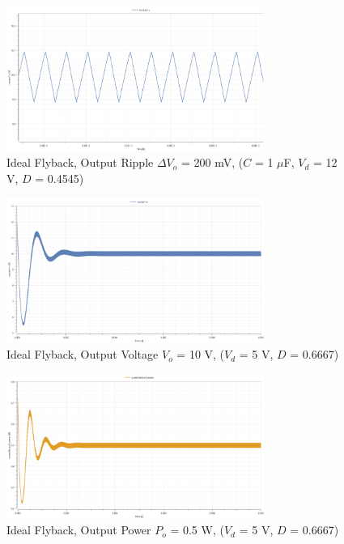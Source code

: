 \documentclass[12pt,twoside]{scrartcl}
\begin{document}
\begin{figure}[htp]
    \centering
    \includegraphics[width=0.75\textwidth]{RippleIdealSim12V.png}
    \caption{Ideal Flyback, Output Ripple $\Delta V_o$ = 200 mV, ($C$ = 1 $\mu$F, $V_d$ = 12 V, $D$ = 0.4545)}
    \label{fig:RippleIdealSim12V}
\end{figure}
\begin{figure}[htp]
    \centering
    \includegraphics[width=0.75\textwidth]{IdealSim5V.png}
    \caption{Ideal Flyback, Output Voltage $V_o$ = 10 V, ($V_d$ = 5 V, $D$ = 0.6667)}
    \label{fig:IdealSim5V}
\end{figure}

\begin{figure}[htp]
    \centering
    \includegraphics[width=0.75\textwidth]{PowerIdealSim12V.png}
    \caption{Ideal Flyback, Output Power $P_o$ = 0.5 W, ($V_d$ = 5 V, $D$ = 0.6667)}
    \label{fig:PowerIdealSim5V}
\end{figure}
\end{document}
